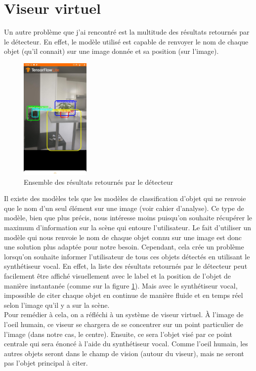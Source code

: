 \documentclass[UTF8]{EPURapport}
\begin{document}
\section{Viseur virtuel}

Un autre problème que j'ai rencontré est la multitude des résultats retournés par le détecteur. En effet, le modèle utilisé est capable de renvoyer le nom de chaque objet (qu'il connait) sur une image donnée et sa position (sur l'image). \\
\newpage

\begin{figure}[h!]
\centering
  \includegraphics[width=0.3\textwidth]{images/multiobj.jpg}
  \caption{Ensemble des résultats retournés par le détecteur}
  \label{fig:multiobj}
\end{figure}

Il existe des modèles tels que les modèles de classification d'objet qui ne renvoie que le nom d'un seul élément sur une image (voir cahier d'analyse). Ce type de modèle, bien que plus précis, nous intéresse moins puisqu'on souhaite récupérer le maximum d'information sur la scène qui entoure l'utilisateur. Le fait d'utiliser un modèle qui nous renvoie le nom de chaque objet connu sur une image est donc une solution plus adaptée pour notre besoin. Cependant, cela crée un problème lorsqu'on souhaite informer l'utilisateur de tous ces objets détectés en utilisant le synthétiseur vocal. En effet, la liste des résultats retournés par le détecteur peut facilement être affiché visuellement avec le label et la position de l'objet de manière instantanée (comme sur la figure \ref{fig:multiobj}). Mais avec le synthétiseur vocal, impossible de citer chaque objet en continue de manière fluide et en temps réel selon l'image qu'il y a sur la scène. \\

Pour remédier à cela, on a réfléchi à un système de viseur virtuel. À l'image de l'oeil humain, ce viseur se chargera de se concentrer sur un point particulier de l'image (dans notre cas, le centre). Ensuite, ce sera l'objet visé par ce point centrale qui sera énoncé à l'aide du synthétiseur vocal. Comme l'oeil humain, les autres objets seront dans le champ de vision (autour du viseur), mais ne seront pas l'objet principal à citer. \\
\newpage
\end{document}

